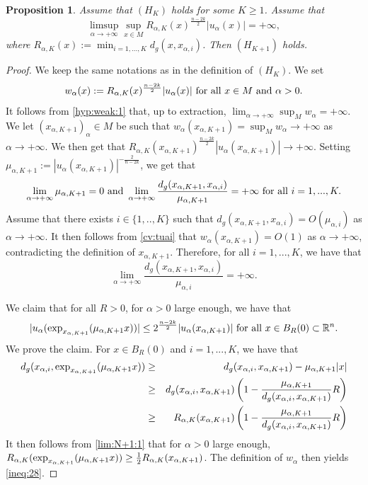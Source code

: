\documentclass[reqno]{amsart}
\newtheorem{proposition}{Proposition}[section]
\def \rn {\mathbb{R}^n}
\def \ua {u_\alpha}
\def \xai {x_{\alpha,i}}
\def \mai {\mu_{\alpha,i}}
\begin{document}
\begin{proposition}\label{prop:rec:1} Assume that $(H_K)$ holds for some $K\geq 1$. Assume that
\begin{equation}\label{hyp:weak:1}
\limsup_{\alpha\to +\infty}\sup_{x\in M}R_{\alpha, K}(x)^{\frac{n-2k}{2}}|\ua(x)|=+\infty,
\end{equation}
where $R_{\alpha, K}(x):=\min_{i=1,...,K}d_g(x,\xai)$. Then $(H_{K+1})$ holds.
\end{proposition}
\begin{proof} We keep the same notations as in the definition of $(H_K)$. We set
$$w_\alpha(x):=R_{\alpha, K}(x)^{\frac{n-2k}{2}}|\ua(x)|\hbox{ for all }x\in M\hbox{ and }\alpha>0.$$
It follows from \eqref{hyp:weak:1} that, up to extraction, $\lim_{\alpha\to +\infty }\sup_Mw_\alpha=+\infty$. We let $(x_{\alpha, K+1})_\alpha\in M$ be such that $w_\alpha(x_{\alpha, K+1})=\sup_Mw_\alpha\to +\infty$ as $\alpha\to +\infty$. We then get that $R_{\alpha, K}(x_{\alpha, K+1})^{\frac{n-2k}{2}}|\ua(x_{\alpha, K+1})|\to +\infty$. Setting $\mu_{\alpha, K+1}:=|\ua(x_{\alpha, K+1})|^{-\frac{2}{n-2k}}$, we get that
\begin{equation}\label{lim:N+1:1}
\lim_{\alpha\to +\infty} \mu_{\alpha, K+1}=0\hbox{ and }\lim_{\alpha\to +\infty}\frac{d_g(x_{\alpha, K+1},\xai)}{\mu_{\alpha, K+1}}=+\infty\hbox{ for all }i=1,...,K.
\end{equation}
Assume that there exists $i\in \{1,..,K\}$ such that $d_g(x_{\alpha, K+1},\xai)=O(\mai)$ as $\alpha\to +\infty$. It then follows from \eqref{cv:tuai} that $w_\alpha(x_{\alpha, K+1})=O(1)$ as $\alpha\to +\infty$, contradicting the definition of $x_{\alpha, K+1}$. Therefore,  for all $i=1,...,K$, we have that
\begin{equation*}
\lim_{\alpha\to +\infty}\frac{d_g(x_{\alpha, K+1},\xai)}{\mai}=+\infty.
\end{equation*}

\medskip\noindent We claim that for all $R>0$, for $\alpha>0$ large enough, we have that
\begin{equation}\label{ineq:28}
|\ua(\hbox{exp}_{x_{\alpha, K+1}}(\mu_{\alpha, K+1} x))|\leq 2^{\frac{n-2k}{2}} |\ua(x_{\alpha, K+1})|\hbox{ for all }x\in B_R(0)\subset \rn.
\end{equation}
We prove the claim. For $x\in B_R(0)$ and $i=1,...,K$, we have that
\begin{eqnarray*}
d_g(\xai, \hbox{exp}_{x_{\alpha, K+1}}(\mu_{\alpha, K+1} x))&\geq& d_g(\xai,  x_{\alpha, K+1})-\mu_{\alpha, K+1} |x|\\
&\geq& d_g(\xai,  x_{\alpha, K+1})\left(1-\frac{\mu_{\alpha, K+1}}{d_g(\xai,  x_{\alpha, K+1})}R\right)\\
&\geq & R_{\alpha, K}(x_{\alpha, K+1})\left(1-\frac{\mu_{\alpha, K+1}}{d_g(\xai,  x_{\alpha, K+1})}R\right)
\end{eqnarray*}
It then follows from \eqref{lim:N+1:1} that for $\alpha>0$ large enough, 
$R_{\alpha,K} (\hbox{exp}_{x_{\alpha, K+1}}(\mu_{\alpha, K+1} x))\geq \frac{1}{2} R_{\alpha, K}(x_{\alpha, K+1})$. The definition of $w_\alpha$ then yields  \eqref{ineq:28}.


\end{proof}
\end{document}
